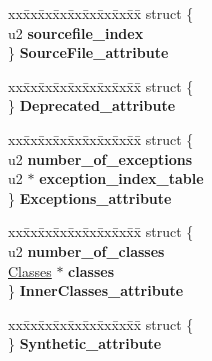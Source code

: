 \begin{DoxyCompactItemize}
\begin{tabbing}
\end{tabbing}\item 
\begin{tabbing}
xx\=xx\=xx\=xx\=xx\=xx\=xx\=xx\=xx\=\kill
struct \{\\
\>u2 {\bfseries sourcefile\_index}\\
\} {\bfseries SourceFile\_attribute}\hypertarget{unionattribute__types_a4c070f5b3468652a8d4face97c3fc4e8}{}\label{unionattribute__types_a4c070f5b3468652a8d4face97c3fc4e8}
\\

\end{tabbing}\item 
\begin{tabbing}
xx\=xx\=xx\=xx\=xx\=xx\=xx\=xx\=xx\=\kill
struct \{\\
\} {\bfseries Deprecated\_attribute}\hypertarget{unionattribute__types_a2c2fb712764e37c9caa0f7c9d83df51b}{}\label{unionattribute__types_a2c2fb712764e37c9caa0f7c9d83df51b}
\\

\end{tabbing}\item 
\begin{tabbing}
xx\=xx\=xx\=xx\=xx\=xx\=xx\=xx\=xx\=\kill
struct \{\\
\>u2 {\bfseries number\_of\_exceptions}\\
\>u2 $\ast$ {\bfseries exception\_index\_table}\\
\} {\bfseries Exceptions\_attribute}\hypertarget{unionattribute__types_ae3da53b0d811eb70361e1328db9b59e9}{}\label{unionattribute__types_ae3da53b0d811eb70361e1328db9b59e9}
\\

\end{tabbing}\item 
\begin{tabbing}
xx\=xx\=xx\=xx\=xx\=xx\=xx\=xx\=xx\=\kill
struct \{\\
\>u2 {\bfseries number\_of\_classes}\\
\>\hyperlink{structClasses}{Classes} $\ast$ {\bfseries classes}\\
\} {\bfseries InnerClasses\_attribute}\hypertarget{unionattribute__types_af84c3875a56f217878eec232fe8e33f3}{}\label{unionattribute__types_af84c3875a56f217878eec232fe8e33f3}
\\

\end{tabbing}\item 
\begin{tabbing}
xx\=xx\=xx\=xx\=xx\=xx\=xx\=xx\=xx\=\kill
struct \{\\
\} {\bfseries Synthetic\_attribute}\hypertarget{unionattribute__types_a04d1c36708ba372962219177169bedf1}{}\label{unionattribute__types_a04d1c36708ba372962219177169bedf1}
\\


\end{tabbing}
\end{DoxyCompactItemize}
